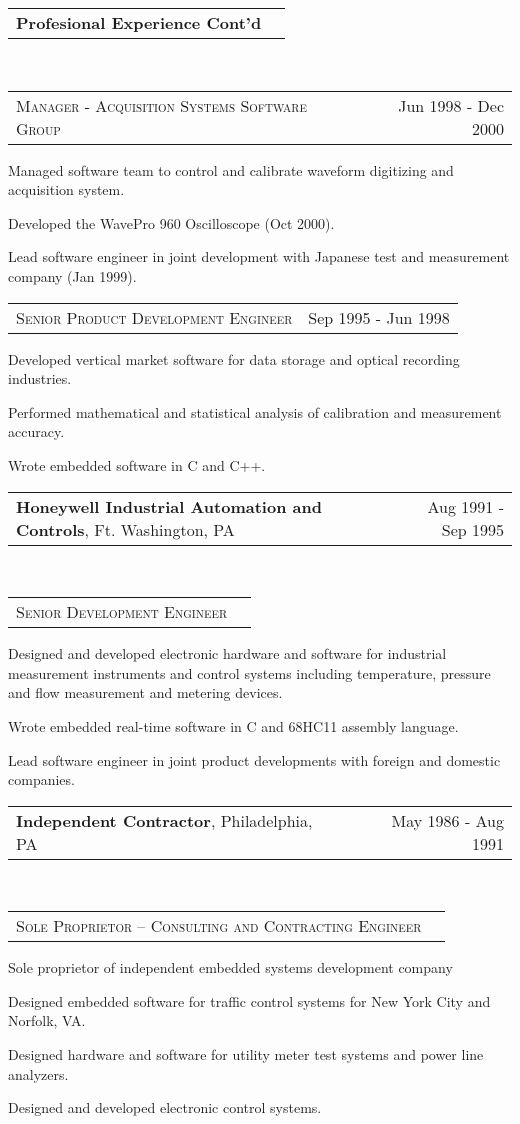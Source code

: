 \documentclass[10pt,letterpaper]{extarticle}
\makeatletter
\newcommand{\headerrow}[2]
{\begin{tabular*}{\linewidth}{l@{\extracolsep{\fill}}r}
	#1 &
	#2 \\
\end{tabular*}}
\makeatother
\begin{document}
\clearpage
\fancyhead[CO,CE]{\LARGE \textcolor[gray]{0.7}{Peter J. Pupalaikis}}
	\headerrow
	{\large \textbf{Profesional Experience Cont'd}}
	{}\\
	\headerrow
	{\large \textsc{Manager - Acquisition Systems Software Group}}
	{Jun 1998 - Dec 2000}\vspace{-\topsep}\begin{itemize*}
	\item Managed  software team to control and calibrate waveform digitizing and acquisition system.
	\item Developed the WavePro 960 Oscilloscope (Oct 2000).
	\item Lead software engineer in joint development with Japanese test and measurement 
	company (Jan 1999).
	\end{itemize*}\vspace{-\topsep}
	\headerrow
	{\large \textsc{Senior Product Development Engineer}}
	{Sep 1995 - Jun 1998}\vspace{-\topsep}\begin{itemize*}
	\item Developed vertical market software for data storage and optical recording industries.
	\item Performed mathematical and statistical analysis of calibration and measurement accuracy.
	\item Wrote embedded software in C and C++.
	\end{itemize*}%
	\headerrow
		{\large \textbf{Honeywell Industrial Automation and Controls}, Ft. Washington, PA}
		{Aug 1991 - Sep 1995}
	\\
	\headerrow
		{\large \textsc{Senior Development Engineer}}
		{}
	\vspace{-2em}\begin{itemize*}
		\item Designed and developed electronic hardware and software for industrial
		measurement instruments and control systems including temperature, pressure and flow
		measurement and metering devices.
		\item Wrote embedded real-time software in C and 68HC11 assembly language.
		\item Lead software engineer in joint product developments with foreign and domestic
		companies.
	\end{itemize*}
	\headerrow
		{\large \textbf{Independent Contractor}, Philadelphia, PA}
		{May 1986 - Aug 1991}
	\\
	\headerrow
		{\large \textsc{Sole Proprietor – Consulting and Contracting Engineer}}
		{}
	\vspace{-2em}\begin{itemize*}
	 \item Sole proprietor of independent embedded systems development company
	 \item Designed embedded software for traffic control systems for New York City and
	 Norfolk, VA.
	 \item Designed hardware and software for utility meter test systems and power line
	 analyzers.
	 \item Designed and developed electronic control systems.
	\end{itemize*}
\end{document}
